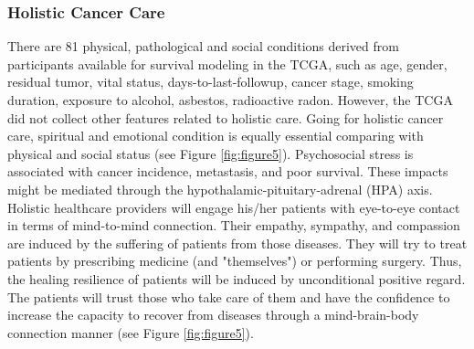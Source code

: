 \documentclass[jpm,article,submit,moreauthors,pdftex]{Definitions/mdpi}
\newenvironment{MyColorPar}[1]{%
    \leavevmode\color{#1}\ignorespaces%
}{%
}%
\begin{document}
\begin{paracol}{2}
\subsubsection{Holistic Cancer Care} 

\begin{MyColorPar}{red}
There are 81 physical, pathological and social conditions derived from participants available for survival modeling in the TCGA, %
such as age, gender, residual tumor, vital status, days-to-last-followup, cancer stage, smoking duration, exposure to alcohol, asbestos, radioactive radon. 
However, the TCGA did not collect other features related to holistic care.
Going for holistic cancer care\cite{Mehta2019}\cite{Iftikhar2021}, spiritual and emotional condition is equally essential comparing with physical and social status (see Figure \ref{fig:figure5}).
Psychosocial stress is associated with cancer incidence\cite{Lutgendorf2010}\cite{Powell2013}\cite{Iftikhar2021}, metastasis\cite{Lutgendorf2010}\cite{Moreno-Smith2010}\cite{Du2020}\cite{Xu2021}, and poor survival\cite{Chida2008}.
These impacts might be mediated through the hypothalamic-pituitary-adrenal (HPA) axis\cite{Hsiao2012}.
Holistic healthcare providers will engage his/her patients with eye-to-eye contact in terms of mind-to-mind connection. Their empathy, sympathy, and compassion are induced by the suffering of patients from those diseases. They will try to treat patients by prescribing medicine (and "themselves") or performing surgery.
Thus, the healing resilience of patients will be induced by unconditional positive regard. %
The patients will trust those who take care of them and have the confidence to increase the capacity to recover from diseases through a mind-brain-body connection manner (see Figure \ref{fig:figure5}).
\end{MyColorPar} %



\end{paracol}
\end{document}
